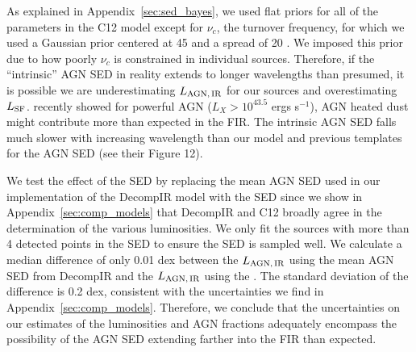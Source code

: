 \documentclass[fleqn, usenatbib]{mnras}
\begin{document}
{\color{red}As explained in Appendix~\ref{sec:sed_bayes}, we used flat priors for all of the parameters in the C12 model except for $\nu_{c}$, the turnover frequency, for which we used a Gaussian prior centered at 45 \micron{} and a spread of 20 \micron. We imposed this prior due to how poorly $\nu_{c}$ is constrained in individual sources. Therefore, if the ``intrinsic'' AGN SED in reality extends to longer wavelengths than presumed, it is possible we are underestimating $L_{\rm AGN,\,IR}$ for our sources and overestimating $L_{\rm SF}$. \citet{Symeonidis:2016fk} recently showed for powerful AGN ($L_{X} > 10^{43.5}$ ergs s$^{-1}$), AGN heated dust might contribute more than expected in the FIR. The \citet{Symeonidis:2016fk} intrinsic AGN SED falls much slower with increasing wavelength than our model and previous templates for the AGN SED (see their Figure 12). 

We test the effect of the \citet{Symeonidis:2016fk} SED by replacing the mean AGN SED used in our implementation of the DecompIR model with the \citet{Symeonidis:2016fk} SED since we show in Appendix~\ref{sec:comp_models} that DecompIR and C12 broadly agree in the determination of the various luminosities. We only fit the sources with more than 4 detected points in the SED to ensure the SED is sampled well. We calculate a median difference of only 0.01 dex between the $L_{\rm AGN,\,IR}$ using the mean AGN SED from DecompIR and the $L_{\rm AGN,\,IR}$ using the \citet{Symeonidis:2016fk}. The standard deviation of the difference is 0.2 dex, consistent with the uncertainties we find in Appendix~\ref{sec:comp_models}. Therefore, we conclude that the uncertainties on our estimates of the luminosities and AGN fractions adequately encompass the possibility of the AGN SED extending farther into the FIR than expected.}
\end{document}
